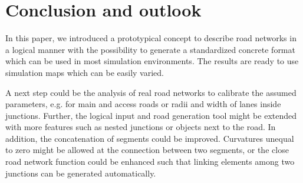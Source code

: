 \documentclass[a4paper, 10pt, conference]{ieeeconf}      %
\begin{document}
\section{Conclusion and outlook}\label{sec_concl}
In this paper, we introduced a prototypical concept to describe road networks in a logical manner with the possibility to generate a standardized concrete format which can be used in most simulation environments.
The results are ready to use simulation maps which can be easily varied.

A next step could be the analysis of real road networks to calibrate the assumed parameters, e.g. for main and access roads or radii and width of lanes inside junctions.
Further, the logical input and road generation tool might be extended with more features such as nested junctions or objects next to the road.
In addition, the concatenation of segments could be improved. Curvatures unequal to zero might be allowed at the connection between two segments, or the close road network function could be enhanced such that linking elements among two junctions can be generated automatically.












\end{document}

